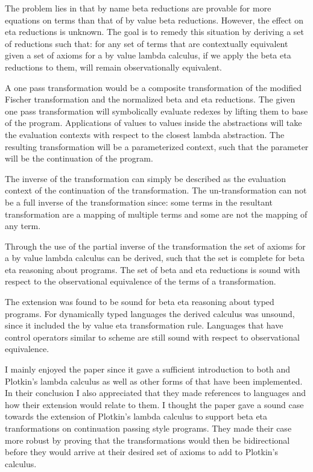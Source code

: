 The problem lies in that by name beta reductions are provable for more equations on \cps terms than that of by value beta reductions.  However, the effect on eta reductions is unknown. The goal is to remedy this situation by deriving a set of reductions such that: for any set of terms that are contextually equivalent given a set of axioms for a by value lambda calculus, if we apply the beta eta reductions to them, will remain observationally equivalent.

A one pass \cps transformation would be a composite transformation of the modified Fischer transformation and the normalized beta and eta reductions.  The given one pass transformation will symbolically evaluate redexes by lifting them to base of the program. Applications of values to values inside the abstractions will take the evaluation contexts with respect to the closest lambda abstraction. The resulting transformation will be a parameterized context, such that the parameter will be the continuation of the program.

The inverse of the \cps transformation can simply be described as the evaluation context of the continuation of the \cps transformation. The un-\cps transformation can not be a full inverse of the \cps transformation since:  some terms in the resultant transformation are a mapping of multiple terms and some are not the mapping of any term.

Through the use of the partial inverse of the \cps transformation the set of axioms for a by value lambda calculus can be derived, such that the set is complete for beta eta reasoning about \cps programs.  The set of beta and eta reductions is sound with respect to the observational equivalence of the terms of a \cps transformation.

The extension was found to be sound for beta eta reasoning about typed \cps programs.  For dynamically typed languages the derived calculus was unsound, since it included the by value eta transformation rule.  Languages that have control operators similar to scheme are still sound with respect to observational equivalence.

I mainly enjoyed the paper since it gave a sufficient introduction to both \cps and Plotkin's lambda calculus as well as other forms of \cps that have been implemented. In their conclusion I also appreciated that they made references to languages and how their extension would relate to them.  I thought the paper gave a sound case towards the extension of Plotkin's lambda calculus to support beta eta tranformations on continuation passing style programs.  They made their case more robust by proving that the transformations would then be bidirectional before they would arrive at their desired set of axioms to add to Plotkin's calculus.





